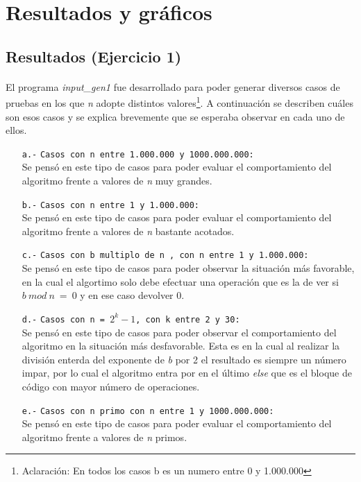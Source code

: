 \section{Resultados y gráficos}

\subsection{Resultados (Ejercicio 1)}
\label{Resultados1}

\paragraph{}
El programa \textit{input\_gen1} fue desarrollado para poder generar diversos casos de pruebas en los que \textit{n} adopte distintos valores\footnote{Aclaración: En todos los casos b es un numero entre 0 y 1.000.000}. A continuación se describen cuáles son esos casos y se explica brevemente que se esperaba observar en cada uno de ellos.
	\begin{itemize}
		\item[\texttt{a.-}]{\texttt{Casos con n entre 1.000.000 y 1000.000.000:} \\
		Se pensó en este tipo de casos para poder evaluar el comportamiento del algoritmo frente a valores de \textit{n} muy grandes.}
		\item[\texttt{b.-}]{\texttt{Casos con n entre 1 y 1.000.000:} \\
		Se pensó en este tipo de casos para poder evaluar el comportamiento del algoritmo frente a valores de \textit{n} bastante acotados.}
		\item[\texttt{c.-}]{\texttt{Casos con b multiplo de n , con n entre 1 y 1.000.000:} \\
		Se pensó en este tipo de casos para poder observar la situación más favorable, en la cual el algortimo solo debe efectuar una operación que es la de ver si $b\ mod\ n\ =\ 0$ y en ese caso devolver 0.}
   		\item[\texttt{d.-}]{\texttt{Casos con n = $2^k - 1$, con k entre 2 y 30:} \\
		Se pensó en este tipo de casos para poder observar el comportamiento del algoritmo en la situación más desfavorable. Esta es en la cual al realizar la división enterda del exponente de \textit{b} por 2 el resultado es siempre un número impar, por lo cual el algoritmo entra por en el último \textit{else} que es el bloque de código con mayor número de operaciones.} 
		\item[\texttt{e.-}]{\texttt{Casos con n primo con n entre 1 y 1000.000.000:} \\
		Se pensó en este tipo de casos para poder evaluar el comportamiento del algoritmo frente a valores de \textit{n} primos.}
	\end{itemize}  

